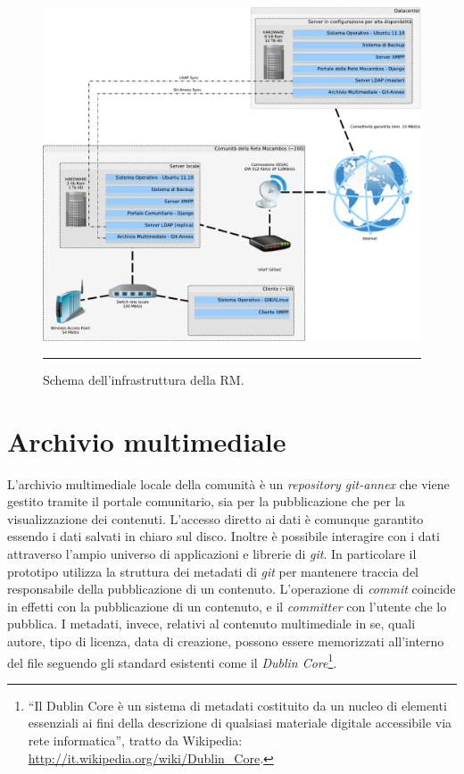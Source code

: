 \begin{figure}[htbp]
  \centering
  \includegraphics[width=\textwidth]{./Figure/SchemaServer_ReteMocambos-crop.pdf}
  \rule{35em}{0.5pt}
  \caption[Schema dell'infrastruttura della RM]{Schema dell'infrastruttura della RM.}
  \label{fig:SchemaServer_ReteMocambos}
\end{figure}


\section{Archivio multimediale}
L'archivio multimediale locale della comunità è un \emph{repository
  git-annex} che viene gestito tramite il portale comunitario, sia per
la pubblicazione che per la visualizzazione dei contenuti. L'accesso
diretto ai dati è comunque garantito essendo i dati salvati in chiaro
sul disco. Inoltre è possibile interagire con i dati attraverso
l'ampio universo di applicazioni e librerie di \emph{git}. In
particolare il prototipo utilizza la struttura dei metadati di
\emph{git} per mantenere traccia del responsabile della pubblicazione
di un contenuto. L'operazione di \emph{commit} coincide in effetti con
la pubblicazione di un contenuto, e il \emph{committer} con l'utente
che lo pubblica. I metadati, invece, relativi al contenuto
multimediale in se, quali autore, tipo di licenza, data di creazione,
possono essere memorizzati all'interno del file seguendo gli standard
esistenti come il \emph{Dublin Core}\footnote{``Il Dublin Core è un
  sistema di metadati costituito da un nucleo di elementi essenziali
  ai fini della descrizione di qualsiasi materiale digitale
  accessibile via rete informatica'', tratto da Wikipedia:
  \url{http://it.wikipedia.org/wiki/Dublin_Core}.}. 

